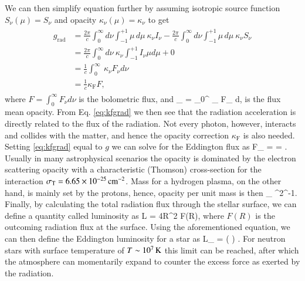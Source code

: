 We can then simplify equation  further by assuming isotropic source function $S_{\nu}(\mu) = S_{\nu}$ and opacity $\kappa_{\nu}(\mu) = \kappa_{\nu}$ to get
\begin{align}\begin{split}\label{eq:kfgrad}
    g_{\mathrm{rad}}
                     &= \frac{2\pi}{c} \int_0^{\infty} d\nu \int_{-1}^{+1} \mu \, d\mu ~  \kappa_{\nu} I_{\nu} 
                       - \frac{2\pi}{c} \int_0^{\infty} d\nu \int_{-1}^{+1} \mu \, d\mu ~  \kappa_{\nu} S_{\nu}\\
                     &= \frac{2\pi}{c} \int_0^{\infty} d\nu ~\kappa_{\nu} \int_{-1}^{+1} I_{\nu} \mu d\mu + 0\\
                     &= \frac{1}{c} \int_0^{\infty} ~ \kappa_{\nu} F_{\nu} d\nu \\
                     &= \frac{1}{c} \kappa_{\mathrm{F}} F,
\end{split}\end{align}
where $F = \int_0^{\infty}F_{\nu} d\nu$ is the bolometric flux, and 
\be
\kappa_{} =  \int_0^{\infty} \kappa_{\nu} F_{\nu} d\nu,
\ee
is the flux mean opacity.\cite{MM84,Poutanen17}
From Eq. \eqref{eq:kfgrad} we then see that the radiation acceleration is directly related to the flux of the radiation.
Not every photon, however, interacts and collides with the matter, and hence the opacity correction $\kappa_{\mathrm{F}}$ is also needed. %
Setting \eqref{eq:kfgrad} equal to $g$ we can solve for the Eddington flux as
\be
F_{} =  =  .
\ee
Usually in many astrophysical scenarios the opacity is dominated by the electron scattering opacity with a characteristic (Thomson) cross-section for the interaction $\sigma_{\mathrm{T}} = 6.65 \times 10^{-25} \, \mathrm{cm}^{-2}$.
Mass for a hydrogen plasma, on the other hand, is mainly set by the protons, hence, opacity per unit mass is then
\be
\kappa_{} \approx {}  \cm^2\unitspace\g^{-1}.
\ee
Finally, by calculating the total radiation flux through the stellar surface, we can define a quantity called luminosity as
\be
L = 4\pi R^2 F(R),
\ee
where $F(R)$ is the outcoming radiation flux at the surface.
Using the aforementioned equation, we can then define the Eddington luminosity for a star as 
\be\label{eq:Ledd}
L_{} =  \approx {} \left(  \right) \ergs.
\ee
For neutron stars with surface temperature of $T \sim 10^7 \, \mathrm{K}$ this limit can be reached, after which the atmosphere can momentarily expand to counter the excess force as exerted by the radiation.



